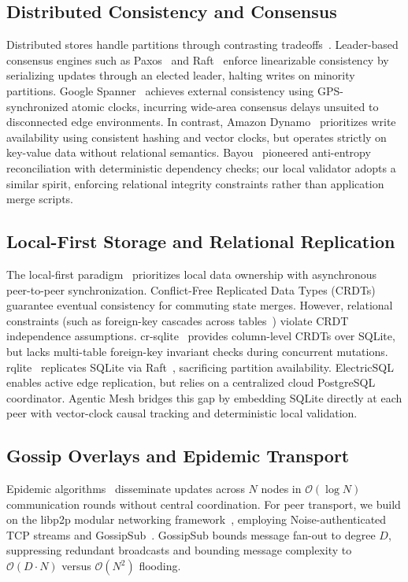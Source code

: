 \subsection{Distributed Consistency and Consensus}
Distributed stores handle partitions through contrasting tradeoffs~\cite{brewer2012cap, gilbert2002brewer}. Leader-based consensus engines such as Paxos~\cite{lamport1998part} and Raft~\cite{ongaro2014raft} enforce linearizable consistency by serializing updates through an elected leader, halting writes on minority partitions. Google Spanner~\cite{corbett2013spanner} achieves external consistency using GPS-synchronized atomic clocks, incurring wide-area consensus delays unsuited to disconnected edge environments. In contrast, Amazon Dynamo~\cite{decandia2007dynamo} prioritizes write availability using consistent hashing and vector clocks, but operates strictly on key-value data without relational semantics. Bayou~\cite{terry1995managing} pioneered anti-entropy reconciliation with deterministic dependency checks; our local validator adopts a similar spirit, enforcing relational integrity constraints rather than application merge scripts.

\subsection{Local-First Storage and Relational Replication}
The local-first paradigm~\cite{kleppmann2019local} prioritizes local data ownership with asynchronous peer-to-peer synchronization. Conflict-Free Replicated Data Types (CRDTs)~\cite{shapiro2011conflict} guarantee eventual consistency for commuting state merges. However, relational constraints (such as foreign-key cascades across tables~\cite{codd1970relational}) violate CRDT independence assumptions. cr-sqlite~\cite{vanderheide2023crsqlite} provides column-level CRDTs over SQLite, but lacks multi-table foreign-key invariant checks during concurrent mutations. rqlite~\cite{schoppmann2022rqlite} replicates SQLite via Raft~\cite{ongaro2014raft}, sacrificing partition availability. ElectricSQL~\cite{electricsql2023} enables active edge replication, but relies on a centralized cloud PostgreSQL coordinator. Agentic Mesh bridges this gap by embedding SQLite directly at each peer with vector-clock causal tracking and deterministic local validation.

\subsection{Gossip Overlays and Epidemic Transport}
Epidemic algorithms~\cite{demers1987epidemic} disseminate updates across $N$ nodes in $\mathcal{O}(\log N)$ communication rounds without central coordination. For peer transport, we build on the libp2p modular networking framework~\cite{trautwein2022libp2p}, employing Noise-authenticated TCP streams and GossipSub~\cite{vyzovitis2020gossipsub}. GossipSub bounds message fan-out to degree $D$, suppressing redundant broadcasts and bounding message complexity to $\mathcal{O}(D \cdot N)$ versus $\mathcal{O}(N^2)$ flooding.

